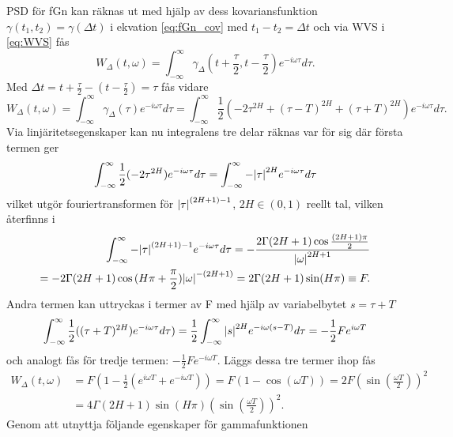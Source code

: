 PSD för fGn kan räknas ut med hjälp av dess kovariansfunktion $\gamma(t_1,t_2)=\gamma(\Delta{t})$ i ekvation \eqref{eq:fGn_cov} med $t_1-t_2=\Delta{t}$ och via WVS i \eqref{eq:WVS} fås
\begin{equation}
    W_{\Delta}(t,\omega)=\int^{\infty}_{-\infty} \gamma_{\Delta}(t+\frac{\tau}{2},t-\frac{\tau}{2}) e^{-i\omega\tau} d\tau.
\end{equation}
Med $\Delta{t}=t+\frac{\tau}{2}-(t-\frac{\tau}{2})=\tau$ fås vidare
\begin{equation} \label{eq:fGn_covterm}
    W_{\Delta}(t,\omega)=\int^{\infty}_{-\infty} \gamma_{\Delta}(\tau) e^{-i\omega\tau} d\tau = \int^{\infty}_{-\infty}\frac{1}{2}(-2\tau^{2H} + (\tau-T)^{2H} + (\tau+T)^{2H}) e^{-i\omega\tau} d\tau.
\end{equation}
Via linjäritetsegenskaper kan nu integralens tre delar räknas var för sig där första termen ger
\begin{equation}
    \int^{\infty}_{-\infty}\frac{1}{2}(-2\tau^{2H})e^{-i\omega\tau} d\tau = \int^{\infty}_{-\infty} -\abs{\tau}^{2H}e^{-i\omega\tau} d\tau 
\end{equation}
vilket utgör fouriertransformen för $\abs{\tau}^{(2H+1)-1}$, $2H\in (0,1)$ reellt tal, vilken återfinns i \cite{BETA}
\begin{align}
    \int^{\infty}_{-\infty} -\abs{\tau}^{(2H+1)-1}e^{-i\omega\tau} d\tau = -\frac{2\Gamma{(2H+1)}\cos{\frac{(2H+1)\pi}{2}}}{\abs{\omega}^{2H+1}} \\ 
    = -2\Gamma{(2H+1)} \cos{(H\pi+\frac{\pi}{2})} \abs{\omega}^{-(2H+1)} = 2\Gamma{(2H+1)}\sin(H\pi) \equiv F.
\end{align}
Andra termen kan uttryckas i termer av F med hjälp av variabelbytet $s=\tau+T$
\begin{equation}
    \int^{\infty}_{-\infty}\frac{1}{2}((\tau+T)^{2H})e^{-i\omega\tau} d\tau) = \frac{1}{2}\int^{\infty}_{-\infty} \abs{s}^{2H} e^{-i\omega(s-T)} d\tau = -\frac{1}{2} F e^{i\omega T} 
\end{equation}
och analogt fås för tredje termen: $-\frac{1}{2} F e^{-i\omega T}$. Läggs dessa tre termer ihop fås
\begin{align}
    W_{\Delta}(t,\omega)&=F(1-\frac{1}{2}(e^{i\omega T}+e^{-i\omega T})) = F(1-\cos(\omega T)) = 2F(\sin(\frac{\omega T}{2}))^2 \\
    &= 4\Gamma{(2H+1)}\sin(H\pi)(\sin(\frac{\omega T}{2}))^2. \label{eq:fGn_PSD_halvklar}
\end{align} 
Genom att utnyttja följande egenskaper för gammafunktionen
